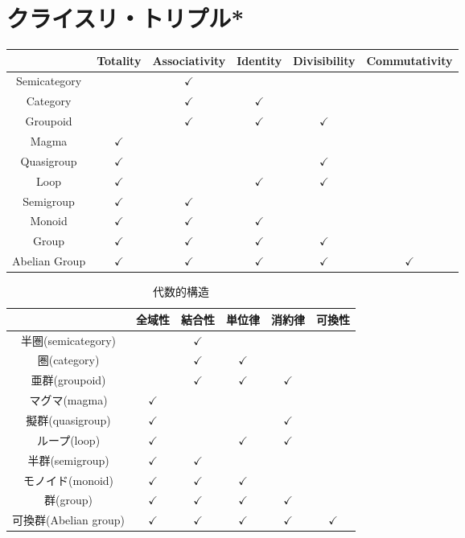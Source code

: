 \documentclass[twocolumn]{jsbook}
\begin{document}
\section{クライスリ・トリプル*}

\begin{table*}
\begin{center}
\begin{tabular}{||c||c|c|c|c|c||}
\hline
&Totality&Associativity&Identity&Divisibility&Commutativity\\
\hline\hline
Semicategory&&$\checkmark$&&&\\
Category&&$\checkmark$&$\checkmark$&&\\
Groupoid&&$\checkmark$&$\checkmark$&$\checkmark$&\\
Magma&$\checkmark$&&&&\\
Quasigroup&$\checkmark$&&&$\checkmark$&\\
Loop&$\checkmark$&&$\checkmark$&$\checkmark$&\\
Semigroup&$\checkmark$&$\checkmark$&&&\\
Monoid&$\checkmark$&$\checkmark$&$\checkmark$&&\\
Group&$\checkmark$&$\checkmark$&$\checkmark$&$\checkmark$&\\
Abelian Group&$\checkmark$&$\checkmark$&$\checkmark$&$\checkmark$&$\checkmark$\\
\hline
\end{tabular}
\end{center}
\end{table*}

\begin{table*}
\caption{代数的構造}
\label{tab:algebraicstrcture}
\begin{center}
\begin{tabular}{||c||c|c|c|c|c||}
\hline
&全域性&結合性&単位律&消約律&可換性\\
\hline\hline
半圏(semicategory)&&$\checkmark$&&&\\
圏(category)&&$\checkmark$&$\checkmark$&&\\
亜群(groupoid)&&$\checkmark$&$\checkmark$&$\checkmark$&\\
マグマ(magma)&$\checkmark$&&&&\\
擬群(quasigroup)&$\checkmark$&&&$\checkmark$&\\
ループ(loop)&$\checkmark$&&$\checkmark$&$\checkmark$&\\
半群(semigroup)&$\checkmark$&$\checkmark$&&&\\
モノイド(monoid)&$\checkmark$&$\checkmark$&$\checkmark$&&\\
群(group)&$\checkmark$&$\checkmark$&$\checkmark$&$\checkmark$&\\
可換群(Abelian group)&$\checkmark$&$\checkmark$&$\checkmark$&$\checkmark$&$\checkmark$\\
\hline
\end{tabular}
\end{center}
\end{table*}
\end{document}
